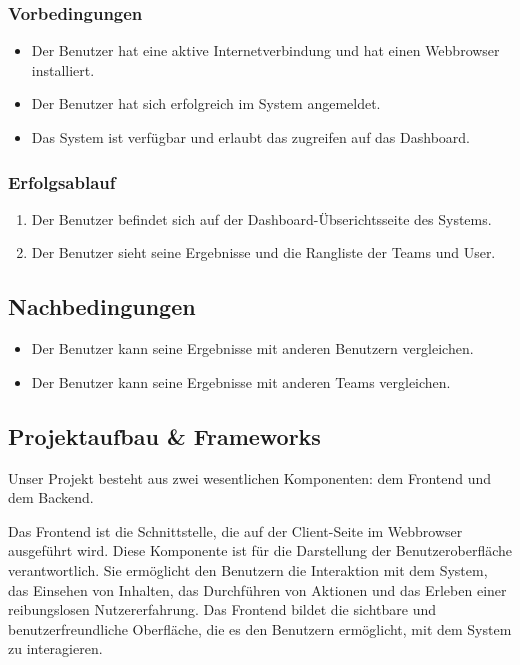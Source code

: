 \subsubsection*{Vorbedingungen}

\begin{itemize}
  \item Der Benutzer hat eine aktive Internetverbindung und hat einen Webbrowser installiert.
  \item Der Benutzer hat sich erfolgreich im System angemeldet.
  \item Das System ist verfügbar und erlaubt das zugreifen auf das Dashboard.
\end{itemize}

\subsubsection*{Erfolgsablauf}

\begin{enumerate}
  \item Der Benutzer befindet sich auf der Dashboard-Übserichtsseite des Systems.
  \item Der Benutzer sieht seine Ergebnisse und die Rangliste der Teams und User.
\end{enumerate}

\subsection*{Nachbedingungen}

\begin{itemize}
  \item Der Benutzer kann seine Ergebnisse mit anderen Benutzern vergleichen.
  \item Der Benutzer kann seine Ergebnisse mit anderen Teams vergleichen.
\end{itemize}

\subsection{Projektaufbau \& Frameworks}

Unser Projekt besteht aus zwei wesentlichen Komponenten: dem Frontend und dem Backend.\newline

\noindent Das Frontend ist die Schnittstelle, die auf der Client-Seite im Webbrowser ausgeführt wird.
Diese Komponente ist für die Darstellung der Benutzeroberfläche verantwortlich. 
Sie ermöglicht den Benutzern die Interaktion mit dem System, das Einsehen von Inhalten, das 
Durchführen von Aktionen und das Erleben einer reibungslosen Nutzererfahrung. 
Das Frontend bildet die sichtbare und benutzerfreundliche Oberfläche, die es den Benutzern 
ermöglicht, mit dem System zu interagieren.\newline

